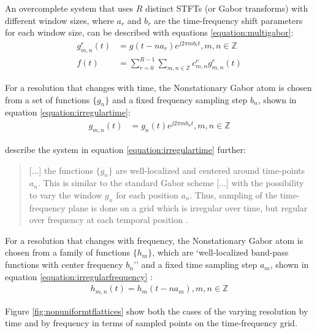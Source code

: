 \documentclass[report.tex]{subfiles}
\begin{document}
An overcomplete system that uses $R$ distinct STFTs (or Gabor transforms) with different window sizes, where $a_{r}$ and $b_{r}$ are the time-frequency shift parameters for each window size, can be described with equations \eqref{equation:multigabor}:
\begin{align}
	\nonumber g_{m,n}^{r}(t) &= g(t - na_{r})e^{j2\pi m b_{r} t}, m,n \in \mathbb{Z}\\
	\nonumber f(t) &= \sum_{r=0}^{R-1}\sum_{m,n \in \mathbb{Z}}c^{r}_{m,n}g^{r}_{m,n}(t) \tag{13}\label{equation:multigabor}
\end{align}

For a resolution that changes with time, the Nonstationary Gabor atom is chosen from a set of functions $\{g_{n}\}$ and a fixed frequency sampling step $b_{n}$, shown in equation \eqref{equation:irregulartime}:
\begin{align}\tag{14}\label{equation:irregulartime}
	g_{m,n}(t) &= g_{n}(t)e^{j2\pi m b_{n}t}, m,n \in \mathbb{Z}
\end{align}

\citeauthor{balazs} describe the system in equation \eqref{equation:irregulartime} further:

\begin{quote}
	[...] the functions $\{g_{n}\}$ are well-localized and centered around time-points $a_{n}$. This is similar to the standard Gabor scheme [...] with the possibility to vary the window $g_{n}$ for each position $a_{n}$. Thus, sampling of the time-frequency plane is done on a grid which is irregular over time, but regular over frequency at each temporal position \parencite[1,485]{balazs}.
\end{quote}

For a resolution that changes with frequency, the Nonstationary Gabor atom is chosen from a family of functions $\{h_{m}\}$, which are `well-localized band-pass functions with center frequency $b_{n}$'' and a fixed time sampling step $a_{m}$, shown in equation \eqref{equation:irregularfrequency} \parencite[1,486]{balazs}:
\begin{align}\tag{15}\label{equation:irregularfrequency}
	h_{m,n}(t) = h_{m}(t - na_{m}), m,n \in \mathbb{Z}
\end{align}

Figure \ref{fig:nonuniformtflattices} show both the cases of the varying resolution by time and by frequency in terms of sampled points on the time-frequency grid.
\end{document}
